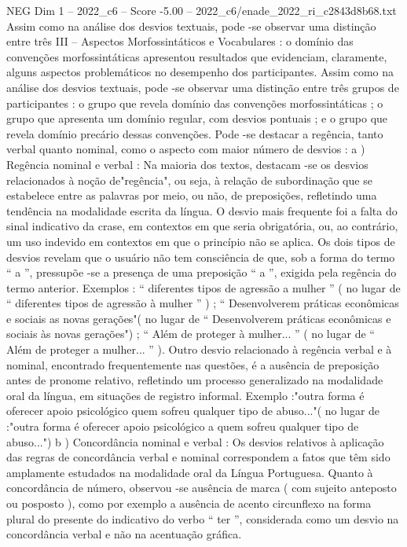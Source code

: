 \begin{textsample}{NEG Dim 1 – 2022\_c6 – Score -5.00 – 2022\_c6/enade\_2022\_ri\_c2843d8b68.txt}
Assim como na análise dos desvios textuais, pode -se observar uma distinção entre três III – Aspectos Morfossintáticos e Vocabulares : o domínio das convenções morfossintáticas apresentou resultados que evidenciam, claramente, alguns aspectos problemáticos no desempenho dos participantes.
Assim como na análise dos desvios textuais, pode -se observar uma distinção entre três grupos de participantes : o grupo que revela domínio das convenções morfossintáticas ; o grupo que apresenta um domínio regular, com desvios pontuais ; e o grupo que revela domínio precário dessas convenções.
Pode -se destacar a regência, tanto verbal quanto nominal, como o aspecto com maior número de desvios : a ) Regência nominal e verbal : Na maioria dos textos, destacam -se os desvios relacionados à noção de"regência", ou seja, à relação de subordinação que se estabelece entre as palavras por meio, ou não, de preposições, refletindo uma tendência na modalidade escrita da língua.
O desvio mais frequente foi a falta do sinal indicativo da crase, em contextos em que seria obrigatória, ou, ao contrário, um uso indevido em contextos em que o princípio não se aplica.
Os dois tipos de desvios revelam que o usuário não tem consciência de que, sob a forma do termo “ a ”, pressupõe -se a presença de uma preposição “ a ”, exigida pela regência do termo anterior.
Exemplos : “ diferentes tipos de agressão a mulher ” ( no lugar de “ diferentes tipos de agressão à mulher ” ) ; “ Desenvolverem práticas econômicas e sociais as novas gerações"( no lugar de “ Desenvolverem práticas econômicas e sociais às novas gerações") ; “ Além de proteger à mulher... ” ( no lugar de “ Além de proteger a mulher... ” ).
Outro desvio relacionado à regência verbal e à nominal, encontrado frequentemente nas questões, é a ausência de preposição antes de pronome relativo, refletindo um processo generalizado na modalidade oral da língua, em situações de registro informal.
Exemplo :"outra forma é oferecer apoio psicológico quem sofreu qualquer tipo de abuso..."( no lugar de :"outra forma é oferecer apoio psicológico a quem sofreu qualquer tipo de abuso...") b ) Concordância nominal e verbal : Os desvios relativos à aplicação das regras de concordância verbal e nominal correspondem a fatos que têm sido amplamente estudados na modalidade oral da Língua Portuguesa.
Quanto à concordância de número, observou -se ausência de marca ( com sujeito anteposto ou posposto ), como por exemplo a ausência de acento circunflexo na forma plural do presente do indicativo do verbo “ ter ”, considerada como um desvio na concordância verbal e não na acentuação gráfica.

\end{textsample}
